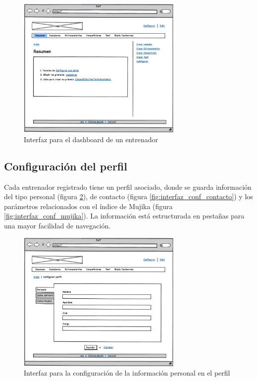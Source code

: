 		\begin{figure}[H]
		  \centering
		    \includegraphics[width=8cm]{./eps/p_interfaz/6_Dashboard.eps}
		  \caption{Interfaz para el dashboard de un entrenador}
		  \label{fig:interfaz_dashboard}
		\end{figure}
		
	
	\subsection{Configuración del perfil} %
		\label{sub:configuracion_del_perfil}
	
	Cada entrenador registrado tiene un perfil asociado, donde se guarda información del tipo personal (figura \ref{fig:interfaz_conf_personal}), de contacto (figura \ref{fig:interfaz_conf_contacto}) y los parámetros relacionados con el índice de Mujika (figura \ref{fig:interfaz_conf_mujika}). La información está estructurada en pestañas para una mayor facilidad de navegación.
	
		\begin{figure}[H]
		  \centering
		    \includegraphics[width=8cm]{./eps/p_interfaz/7_Conf_personal.eps}
		  \caption{Interfaz para la configuración de la información personal en el perfil}
		  \label{fig:interfaz_conf_personal}
		\end{figure}
		
